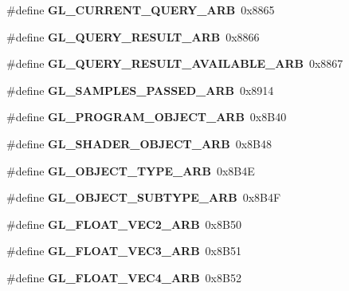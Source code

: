 \begin{DoxyCompactItemize}
\item 
\#define {\bfseries G\+L\+\_\+\+C\+U\+R\+R\+E\+N\+T\+\_\+\+Q\+U\+E\+R\+Y\+\_\+\+A\+R\+B}~0x8865\label{_s_d_l__opengl_8h_a1a99272a79beb2c11ee6d8df89dbdfa3}

\item 
\#define {\bfseries G\+L\+\_\+\+Q\+U\+E\+R\+Y\+\_\+\+R\+E\+S\+U\+L\+T\+\_\+\+A\+R\+B}~0x8866\label{_s_d_l__opengl_8h_afe6a7e6dd3fc749521facdc709f1b79e}

\item 
\#define {\bfseries G\+L\+\_\+\+Q\+U\+E\+R\+Y\+\_\+\+R\+E\+S\+U\+L\+T\+\_\+\+A\+V\+A\+I\+L\+A\+B\+L\+E\+\_\+\+A\+R\+B}~0x8867\label{_s_d_l__opengl_8h_a2767b059926f09b114c4b4ef555283ea}

\item 
\#define {\bfseries G\+L\+\_\+\+S\+A\+M\+P\+L\+E\+S\+\_\+\+P\+A\+S\+S\+E\+D\+\_\+\+A\+R\+B}~0x8914\label{_s_d_l__opengl_8h_ae15e94a6e68daec5a04c417d88776e4d}

\item 
\#define {\bfseries G\+L\+\_\+\+P\+R\+O\+G\+R\+A\+M\+\_\+\+O\+B\+J\+E\+C\+T\+\_\+\+A\+R\+B}~0x8\+B40\label{_s_d_l__opengl_8h_a01dbd05169c339aa106f4e19c4c68e6b}

\item 
\#define {\bfseries G\+L\+\_\+\+S\+H\+A\+D\+E\+R\+\_\+\+O\+B\+J\+E\+C\+T\+\_\+\+A\+R\+B}~0x8\+B48\label{_s_d_l__opengl_8h_acc1bdfb0670f8857acfe51b3c99ef5e2}

\item 
\#define {\bfseries G\+L\+\_\+\+O\+B\+J\+E\+C\+T\+\_\+\+T\+Y\+P\+E\+\_\+\+A\+R\+B}~0x8\+B4\+E\label{_s_d_l__opengl_8h_a7e8aadcd710711b53333987f661d0a3d}

\item 
\#define {\bfseries G\+L\+\_\+\+O\+B\+J\+E\+C\+T\+\_\+\+S\+U\+B\+T\+Y\+P\+E\+\_\+\+A\+R\+B}~0x8\+B4\+F\label{_s_d_l__opengl_8h_acb1eadeab998cc67a92b8364cff24ea2}

\item 
\#define {\bfseries G\+L\+\_\+\+F\+L\+O\+A\+T\+\_\+\+V\+E\+C2\+\_\+\+A\+R\+B}~0x8\+B50\label{_s_d_l__opengl_8h_a5a915785c9c1384397508f85023c1a8d}

\item 
\#define {\bfseries G\+L\+\_\+\+F\+L\+O\+A\+T\+\_\+\+V\+E\+C3\+\_\+\+A\+R\+B}~0x8\+B51\label{_s_d_l__opengl_8h_ae006c284df5b4e1c8690407157c255d5}

\item 
\#define {\bfseries G\+L\+\_\+\+F\+L\+O\+A\+T\+\_\+\+V\+E\+C4\+\_\+\+A\+R\+B}~0x8\+B52\label{_s_d_l__opengl_8h_a4b4710222c39469d8c19acd2b7227e3c}


\end{DoxyCompactItemize}
